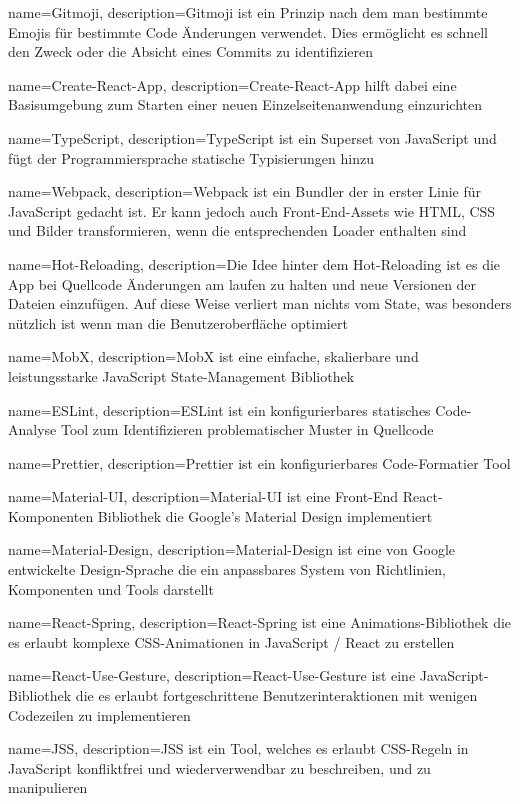{   name={Gitmoji},
    description={Gitmoji ist ein Prinzip nach dem man bestimmte Emojis für bestimmte Code Änderungen verwendet. Dies ermöglicht es schnell den Zweck oder die Absicht eines Commits zu identifizieren}
}

{   name={Create-React-App},
    description={Create-React-App hilft dabei eine Basisumgebung zum Starten einer neuen Einzelseitenanwendung einzurichten}
}

{   name={TypeScript},
    description={TypeScript ist ein Superset von JavaScript und fügt der Programmiersprache statische Typisierungen hinzu}
}

{   name={Webpack},
    description={Webpack ist ein Bundler der in erster Linie für JavaScript gedacht ist. Er kann jedoch auch Front-End-Assets wie HTML, CSS und Bilder transformieren, wenn die entsprechenden Loader enthalten sind}
}

{   name={Hot-Reloading},
    description={Die Idee hinter dem Hot-Reloading ist es die App bei Quellcode Änderungen am laufen zu halten und neue Versionen der Dateien einzufügen. Auf diese Weise verliert man nichts vom State, was besonders nützlich ist wenn man die Benutzeroberfläche optimiert}
}

{   name={MobX},
    description={MobX ist eine einfache, skalierbare und leistungsstarke JavaScript State-Management Bibliothek}
}

{   name={ESLint},
    description={ESLint ist ein konfigurierbares statisches Code-Analyse Tool zum Identifizieren problematischer Muster in Quellcode}
}

{   name={Prettier},
    description={Prettier ist ein konfigurierbares Code-Formatier Tool}
}

{   name={Material-UI},
    description={Material-UI ist eine Front-End React-Komponenten Bibliothek die Google's Material Design implementiert}
}

{   name={Material-Design},
    description={Material-Design ist eine von Google entwickelte Design-Sprache die ein anpassbares System von Richtlinien, Komponenten und Tools darstellt}
}

{   name={React-Spring},
    description={React-Spring ist eine Animations-Bibliothek die es erlaubt komplexe CSS-Animationen in JavaScript / React zu erstellen}
}

{   name={React-Use-Gesture},
    description={React-Use-Gesture ist eine JavaScript-Bibliothek die es erlaubt fortgeschrittene Benutzerinteraktionen mit wenigen Codezeilen zu implementieren}
}

{   name={JSS},
    description={JSS ist ein Tool, welches es erlaubt CSS-Regeln in JavaScript konfliktfrei und wiederverwendbar zu beschreiben, und zu manipulieren}
}
